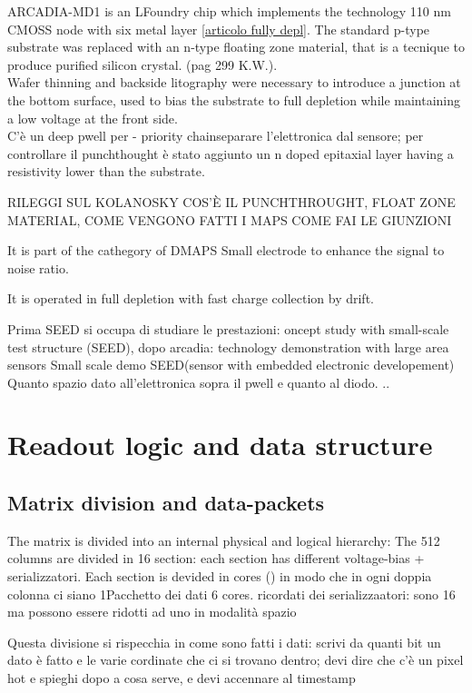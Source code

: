 

ARCADIA-MD1 is an LFoundry chip which implements the technology 110 nm CMOSS node
with six metal layer \ref{articolo fully depl}.
The standard p-type substrate was replaced with an n-type floating zone material,
that is a tecnique to produce purified silicon crystal. (pag 299 K.W.).\\

Wafer thinning and backside litography were necessary to introduce a junction
at the bottom surface, used to bias the substrate to full depletion while
maintaining a low voltage at the front side.  \\
C'è un deep pwell per - priority chainseparare l'elettronica dal sensore; per controllare il punchthought
è stato aggiunto un n doped epitaxial layer having a resistivity lower than the substrate.

RILEGGI SUL KOLANOSKY COS'È IL PUNCHTHROUGHT, FLOAT ZONE MATERIAL, COME VENGONO FATTI I MAPS
COME FAI LE GIUNZIONI



It is part of the cathegory of DMAPS
Small electrode to enhance the signal to noise ratio.

It is operated in full depletion with fast charge collection by drift.

Prima SEED si occupa di studiare le prestazioni: oncept study with small-scale test structure (SEED),
dopo arcadia: technology demonstration with large area sensors
Small scale demo SEED(sensor with embedded electronic developement)
Quanto spazio dato all'elettronica sopra il pwell e quanto al diodo. ..

\section{Readout logic and data structure}
\subsection{Matrix division and data-packets}
The matrix is divided into an internal physical and logical hierarchy:
The 512 columns are divided in 16 section: each section has different voltage-bias + serializzatori.
Each section is devided in cores () in modo che in ogni doppia colonna ci siano 1Pacchetto dei dati
6 cores. ricordati dei serializzaatori: sono 16 ma possono essere ridotti ad uno in modalità spazio

Questa divisione si rispecchia in come sono fatti i dati: scrivi da quanti bit un
dato è fatto e le varie cordinate che ci si trovano dentro; devi dire che c'è un pixel hot
e spieghi dopo a cosa serve, e devi accennare al timestamp


